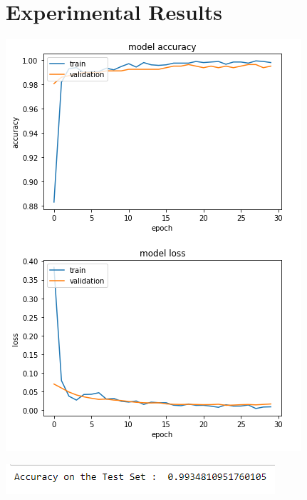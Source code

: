 \section{Experimental Results} 
\includegraphics{Images/LossAndAccuracy.PNG}

\includegraphics{Images/testAccuracy.PNG}